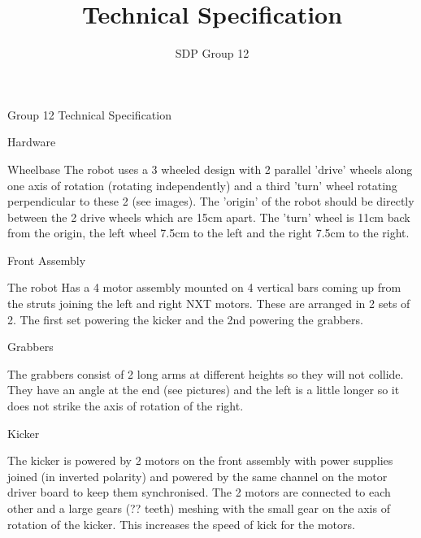 \documentclass[11pt,a4paper]{article}
\author{SDP Group 12}
\title{Technical Specification}
\begin{document}
\maketitle
Group 12 Technical Specification

\maketitle 
Hardware

\maketitle
Wheelbase
The robot uses a 3 wheeled design with 2 parallel 'drive' wheels along one 
axis of rotation (rotating independently) and a third 'turn' wheel rotating 
perpendicular to these 2 (see images). The 'origin' of the robot should be 
directly between the 2 drive wheels which are 15cm apart. The 'turn' wheel 
is 11cm back from the origin, the left wheel 7.5cm to the left and the right
7.5cm to the right. 

\maketitle
Front Assembly

The robot Has a 4 motor assembly mounted on 4 vertical bars coming up from the
struts joining the left and right NXT motors. These are arranged in 2 sets of 2.
The first set powering the kicker and the 2nd powering the grabbers.

\maketitle 
Grabbers

The grabbers consist of 2 long arms at different heights so they will not collide.
They have an angle at the end (see pictures) and the left is a little longer so
it does not strike the axis of rotation of the right.

\maketitle
Kicker

The kicker is powered by 2 motors on the front assembly with power supplies joined
(in inverted polarity) and powered by the same channel on the motor driver board to
keep them synchronised. The 2 motors are connected to each other and a large gears
(?? teeth) meshing with the small gear on the axis of rotation of the kicker. This
increases the speed of kick for the motors.
\end{document}
